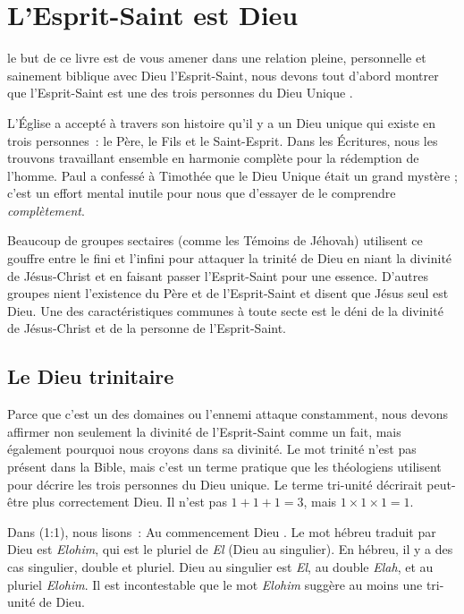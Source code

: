 \chapter{L'Esprit-Saint est Dieu}

 le but de ce livre est de vous amener
 dans une relation pleine, personnelle et sainement biblique avec
 Dieu l'Esprit-Saint, nous devons tout d'abord montrer que l'Esprit-Saint
 est une des trois personnes du Dieu Unique
 .

L'Église a accepté à travers son histoire qu'il y a un Dieu unique
 qui existe en trois personnes~: le Père, le Fils et le Saint-Esprit.
 Dans les Écritures, nous les trouvons travaillant ensemble en harmonie
 complète pour la rédemption de l'homme.
 Paul a confessé à Timothée que le Dieu Unique était un grand mystère ;
 c'est un effort mental inutile pour nous que d'essayer de le comprendre
 \emph{complètement}.

Beaucoup de groupes sectaires (comme les Témoins de Jéhovah) utilisent
 ce gouffre entre le fini et l'infini pour attaquer la trinité de Dieu
 en niant la divinité de Jésus-Christ et en faisant passer l'Esprit-Saint
 pour une essence.
 D'autres groupes nient l'existence du Père et de l'Esprit-Saint et disent
 que Jésus seul est Dieu.
 Une des caractéristiques communes à toute secte est le déni de la divinité
 de Jésus-Christ et de la personne de l'Esprit-Saint.

\section*{Le Dieu trinitaire}

Parce que c'est un des domaines ou l'ennemi attaque constamment, nous devons
 affirmer non seulement la divinité de l'Esprit-Saint comme un fait,
 mais également pourquoi nous croyons dans sa divinité.
 Le mot \og trinité \fg{} n'est pas présent dans la Bible, mais c'est un
 terme pratique que les théologiens utilisent pour décrire les trois personnes
 du Dieu unique.
 Le terme \og tri-unité \fg{} décrirait peut-être plus correctement Dieu.
 Il n'est pas $1 + 1 + 1 = 3$, mais $1 \times 1 \times 1 = 1$.

Dans (1:1), nous lisons~:
 \og Au commencement Dieu \fg{}.
 Le mot hébreu traduit par \og Dieu \fg{} est \emph{Elohim}, qui est
 le pluriel de \emph{El} (Dieu au singulier).
 En hébreu, il y a des cas singulier, double et pluriel.
 \og Dieu \fg{} au singulier est \emph{El}, au double \emph{Elah},
 et au pluriel \emph{Elohim}.
 Il est incontestable que le mot \emph{Elohim} suggère au moins
 une tri-unité de Dieu.

